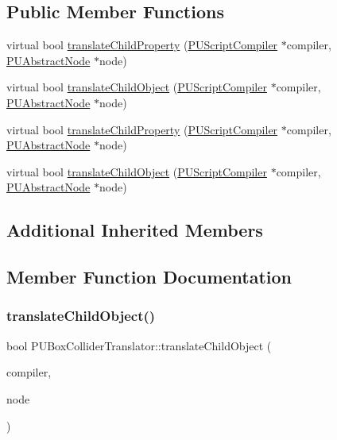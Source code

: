 \subsection*{Public Member Functions}
\begin{DoxyCompactItemize}
\item 
virtual bool \hyperlink{classPUBoxColliderTranslator_afecc73c3759d1a0fe522dd0c53f8cf9c}{translate\+Child\+Property} (\hyperlink{classPUScriptCompiler}{P\+U\+Script\+Compiler} $\ast$compiler, \hyperlink{classPUAbstractNode}{P\+U\+Abstract\+Node} $\ast$node)
\item 
virtual bool \hyperlink{classPUBoxColliderTranslator_a54c0208ba40c78d9aeb0eef9946e57a1}{translate\+Child\+Object} (\hyperlink{classPUScriptCompiler}{P\+U\+Script\+Compiler} $\ast$compiler, \hyperlink{classPUAbstractNode}{P\+U\+Abstract\+Node} $\ast$node)
\item 
virtual bool \hyperlink{classPUBoxColliderTranslator_ace524cc06a94cc0ac8dca7845121d0b9}{translate\+Child\+Property} (\hyperlink{classPUScriptCompiler}{P\+U\+Script\+Compiler} $\ast$compiler, \hyperlink{classPUAbstractNode}{P\+U\+Abstract\+Node} $\ast$node)
\item 
virtual bool \hyperlink{classPUBoxColliderTranslator_a899ed5304b2dd9b04d2ce752d7566adc}{translate\+Child\+Object} (\hyperlink{classPUScriptCompiler}{P\+U\+Script\+Compiler} $\ast$compiler, \hyperlink{classPUAbstractNode}{P\+U\+Abstract\+Node} $\ast$node)
\end{DoxyCompactItemize}
\subsection*{Additional Inherited Members}


\subsection{Member Function Documentation}
\mbox{\label{classPUBoxColliderTranslator_a54c0208ba40c78d9aeb0eef9946e57a1}} 
\subsubsection{\texorpdfstring{translate\+Child\+Object()}{translateChildObject()}\hspace{0.1cm}{\footnotesize\ttfamily [1/2]}}
{\footnotesize\ttfamily bool P\+U\+Box\+Collider\+Translator\+::translate\+Child\+Object (\begin{DoxyParamCaption}\item[{\hyperlink{classPUScriptCompiler}{P\+U\+Script\+Compiler} $\ast$}]{compiler,  }\item[{\hyperlink{classPUAbstractNode}{P\+U\+Abstract\+Node} $\ast$}]{node }\end{DoxyParamCaption})\hspace{0.3cm}{\ttfamily [virtual]}}

